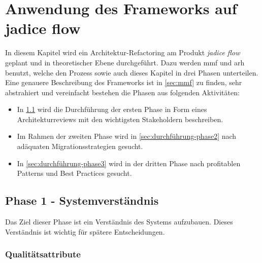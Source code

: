 \chapter{Anwendung des Frameworks auf jadice flow}
\label{chap:anwendung}

In diesem Kapitel wird ein Architektur-Refactoring am Produkt \emph{jadice flow} geplant und in theoretischer Ebene durchgeführt.
Dazu werden \acrfull{mmf} und \acrfull{arh} benutzt, welche den Prozess sowie auch dieses Kapitel in drei Phasen unterteilen.
Eine genauere Beschreibung des Frameworks ist in \cref{sec:mmf} zu finden, sehr abstrahiert und vereinfacht bestehen die Phasen aus folgenden Aktivitäten:
\begin{itemize}
	\item In \cref{sec:durchführung-phase1} wird die Durchführung der ersten Phase in Form eines Architekturreviews mit den wichtigsten Stakeholdern beschreiben.
	\item Im Rahmen der zweiten Phase wird in \cref{sec:durchführung-phase2} nach adäquaten Migrationsstrategien gesucht.
	\item In \cref{sec:durchführung-phase3} wird in der dritten Phase nach profitablen Patterns und Best Practices gesucht.
\end{itemize}

\section{Phase 1 - Systemverständnis}
\label{sec:durchführung-phase1}

Das Ziel dieser Phase ist ein Verständnis des Systems aufzubauen.
Dieses Verständnis ist wichtig für spätere Entscheidungen.

\subsection{Qualitätsattribute}

